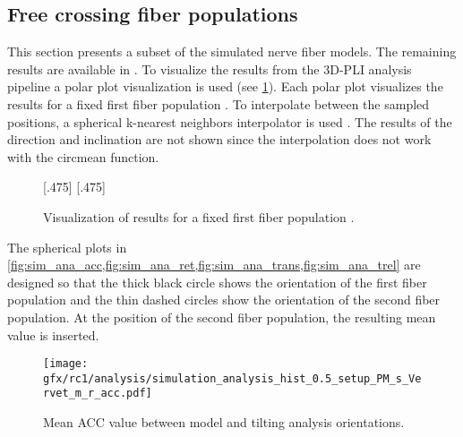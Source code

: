 \subsection{Free crossing fiber populations}
\label{sec:resFreeCross}
%
This section presents a subset of the simulated nerve fiber models.
The remaining results are available in \dummy{}.
To visualize the results from the \ac{3D-PLI} analysis pipeline a polar plot visualization is used (see \cref{fig:simModelSphereSample}).
Each polar plot visualizes the results for a fixed first fiber population \popa{}.
To interpolate between the sampled positions, a spherical k-nearest neighbors interpolator is used \cite{DBLP:journals/corr/abs-1910-00704}.
The results of the direction and inclination are not shown since the interpolation does not work with the circmean function.
% 
\begin{figure}[t]
\centering
\setlength{\tikzwidth}{0.40\textwidth}
[.475\textwidth]{}
\hfill
{}
[.475\textwidth]{}
\caption{Visualization of results for a fixed first fiber population \popa{}.}
\label{fig:simModelSphereSample}
\end{figure}
%
The spherical plots in \cref{fig:sim_ana_acc,fig:sim_ana_ret,fig:sim_ana_trans,fig:sim_ana_trel} are designed so that the thick black circle shows the orientation of the first fiber population and the thin dashed circles show the orientation of the second fiber population.
At the position of the second fiber population, the resulting mean value is inserted.
%
%
%
\begin{figure}[!p]
\centering
\texttt{[image: gfx/rc1/analysis/simulation\_analysis\_hist\_0.5\_setup\_PM\_s\_Vervet\_m\_r\_acc.pdf]}
\caption{Mean \ac{ACC} value between model and tilting analysis orientations. }
\label{fig:sim_ana_acc}
\end{figure}
%
